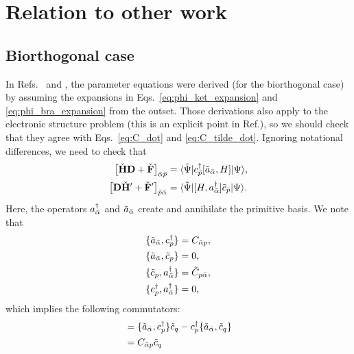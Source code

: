 \documentclass[aip,jcp,preprint,superscriptaddress,nofootinbib]{revtex4-1}
\begin{document}
\section{Relation to other work}
\subsection{Biorthogonal case}
In Refs.~ and ,
the parameter equations were derived (for the biorthogonal case) by assuming the expansions in
Eqs.~\eqref{eq:phi_ket_expansion} and \eqref{eq:phi_bra_expansion} from the outset.
Those derivations also apply to the electronic structure problem
(this is an explicit point in Ref.), so we
should check that they agree with Eqs.~\eqref{eq:C_dot} and \eqref{eq:C_tilde_dot}.
Ignoring notational differences, we need to check that
\begin{subequations} \label{eq:F_check_correspondence_ab}
    \begin{align}
        \big[ \check{\mathbf{H}} \mathbf{D} + \check{\mathbf{F}} \big]_{\bar{\alpha} \bar{p}}
        &= \langle \tilde{\Psi} \vert  c^{\dagger}_{\bar{p}} [\tilde{a}_{\bar{\alpha}}, H]  \vert \Psi \rangle,  \label{eq:F_check_correspondence} \\
        \big[ \mathbf{D} \check{\mathbf{H}}' + \check{\mathbf{F}}' \big]_{\bar{p} \bar{\alpha}} 
        &= \langle \tilde{\Psi} \vert  [H, a^{\dagger}_{\bar{\alpha}}] \tilde{c}_{\bar{p}}   \vert \Psi \rangle.  \label{eq:F_check_prime_correspondence}
    \end{align}
\end{subequations}
Here, the operators $a^{\dagger}_{\bar{\alpha}}$ and $\tilde{a}_{\bar{\alpha}}$ create and annihilate
the primitive basis. We note that
\begin{align}
    \{ \tilde{a}_{\bar{\alpha}}, c^{\dagger}_{p} \} &= C_{\bar{\alpha} p}, \\
    \{ \tilde{a}_{\bar{\alpha}}, \tilde{c}_{p} \} &= 0, \\
    \{ \tilde{c}_{p}, a^{\dagger}_{\bar{\alpha}} \} &= \tilde{C}_{p \bar{\alpha}}, \\
    \{ c^{\dagger}_{p}, a^{\dagger}_{\bar{\alpha}} \} &= 0,
\end{align}
which implies the following commutators:
\begin{align}
    [\anniprim{\bar{\alpha}}, \crea{p} \anni{q}] 
    &= \{ \anniprim{\bar{\alpha}}, \crea{p} \} \anni{q} - \crea{p} \{ \anniprim{\bar{\alpha}}, \anni{q} \} \nn
    &= C_{\bar{\alpha} p} \anni{q}
\end{align}
\end{document}
